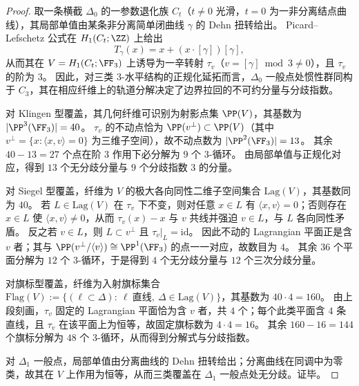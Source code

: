\begin{proof}
取一条横截 \(\Delta_0\) 的一参数退化族 \(C_t\)（\(t\neq 0\) 光滑，\(t=0\) 为一非分离结点曲线），其局部单值由某条非分离简单闭曲线 \(\gamma\) 的 Dehn 扭转给出。
Picard--Lefschetz 公式在 \(H_1(C_t;\ZZ)\) 上给出
\[
T_\gamma(x)=x+(x\cdot[\gamma])[\gamma],
\]
从而其在 \(V=H_1(C_t;\FF_3)\) 上诱导为一辛转射 \(\tau_v\)（\(v=[\gamma]\bmod 3\neq 0\)），且 \(\tau_v\) 的阶为 \(3\)。
因此，对三类 \(3\)-水平结构的正规化延拓而言，\(\Delta_0\) 一般点处惯性群同构于 \(C_3\)，其在相应纤维上的轨道分解决定了边界拉回的不可约分量与分歧指数。
\par
对 Klingen 型覆盖，其几何纤维可识别为射影点集 \(\PP(V)\)，其基数为 \(|\PP^3(\FF_3)|=40\)。
\(\tau_v\) 的不动点恰为 \(\PP(v^\perp)\subset \PP(V)\)（其中 \(v^\perp=\{x:\langle x,v\rangle=0\}\) 为三维子空间），故不动点数为 \(|\PP^2(\FF_3)|=13\)。
其余 \(40-13=27\) 个点在阶 \(3\) 作用下必分解为 \(9\) 个 \(3\)-循环。
由局部单值与正规化对应，得到 \(13\) 个无分歧分量与 \(9\) 个分歧指数 \(3\) 的分量。
\par
对 Siegel 型覆盖，纤维为 \(V\) 的极大各向同性二维子空间集合 \(\mathrm{Lag}(V)\)，其基数同为 \(40\)。
若 \(L\in \mathrm{Lag}(V)\) 在 \(\tau_v\) 下不变，则对任意 \(x\in L\) 有 \(\langle x,v\rangle=0\)；否则存在 \(x\in L\) 使 \(\langle x,v\rangle\neq 0\)，从而 \(\tau_v(x)-x\) 与 \(v\) 共线并强迫 \(v\in L\)，与 \(L\) 各向同性矛盾。
反之若 \(v\in L\)，则 \(L\subset v^\perp\) 且 \(\tau_v|_L=\mathrm{id}\)。
因此不动的 Lagrangian 平面正是含 \(v\) 者；其与 \(\PP(v^\perp/\langle v\rangle)\cong \PP^1(\FF_3)\) 的点一一对应，故数目为 \(4\)。
其余 \(36\) 个平面分解为 \(12\) 个 \(3\)-循环，于是得到 \(4\) 个无分歧分量与 \(12\) 个三次分歧分量。
\par
对旗标型覆盖，纤维为入射旗标集合
\(
\mathrm{Flag}(V):=\{(\ell\subset \Delta):\ \ell\ \text{直线},\ \Delta\in \mathrm{Lag}(V)\}
\)，其基数为 \(40\cdot 4=160\)。
由上段刻画，\(\tau_v\) 固定的 Lagrangian 平面恰为含 \(v\) 者，共 \(4\) 个；每个此类平面含 \(4\) 条直线，且 \(\tau_v\) 在该平面上为恒等，故固定旗标数为 \(4\cdot 4=16\)。
其余 \(160-16=144\) 个旗标分解为 \(48\) 个 \(3\)-循环，从而得到分解式与分歧指数。
\par
对 \(\Delta_1\) 一般点，局部单值由分离曲线的 Dehn 扭转给出；分离曲线在同调中为零类，故其在 \(V\) 上作用为恒等，从而三类覆盖在 \(\Delta_1\) 一般点处无分歧。证毕。
\end{proof}

